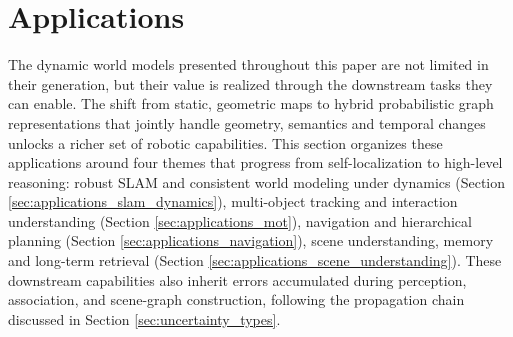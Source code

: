 \section{Applications}\label{sec:applications}
The dynamic world models presented throughout this paper are not limited in their generation, but their value is realized through the downstream tasks they can enable.
The shift from static, geometric maps to hybrid probabilistic graph representations that jointly handle geometry, semantics and temporal changes unlocks a richer set of robotic capabilities.
This section organizes these applications around four themes that progress from self-localization to high-level reasoning: robust SLAM and consistent world modeling under dynamics (Section \ref{sec:applications_slam_dynamics}), multi-object tracking and interaction understanding (Section \ref{sec:applications_mot}), navigation and hierarchical planning (Section \ref{sec:applications_navigation}), scene understanding, memory and long-term retrieval (Section \ref{sec:applications_scene_understanding}).
These downstream capabilities also inherit errors accumulated during perception, association, and scene-graph construction, following the propagation chain discussed in Section \ref{sec:uncertainty_types}.

